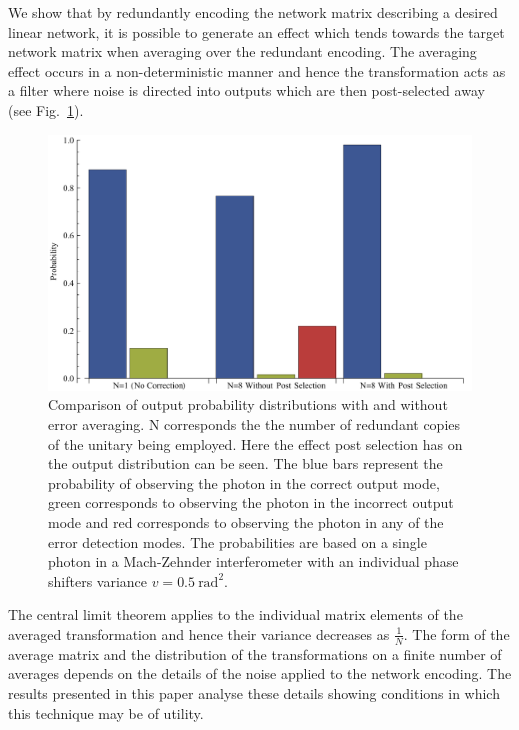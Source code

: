 \documentclass[aps,pra,twocolumn,superscriptaddress,numerical,floatfix]{revtex4-1}
\begin{document}
We show that by redundantly encoding the network matrix describing a desired linear network, it is possible to generate an effect which tends towards the target network matrix when averaging over the redundant encoding.   The averaging effect occurs in a non-deterministic manner and hence the transformation acts as a filter where noise is directed into outputs which are then post-selected away (see Fig.~\ref{fig:output_probabilities}).
\begin{figure}
	\begin{centering}
		\includegraphics[width=\columnwidth]{prob_distributions.pdf}
	\end{centering}
	\caption[Comparison of output probability distributions with and without Error Averaging.]{Comparison of output probability distributions with and without error averaging. N corresponds the the number of redundant copies of the unitary being employed. Here the effect post selection has on the output distribution can be seen. The blue bars represent the probability of observing the photon in the correct output mode, green corresponds to observing the photon in the incorrect output mode and red corresponds to observing the photon in any of the error detection modes. The probabilities are based on a single photon in a Mach-Zehnder interferometer with an individual phase shifters variance $v=0.5\ \textrm{rad}^{2}$.} 
	\label{fig:output_probabilities}
\end{figure}
The central limit theorem applies to the individual matrix elements of the averaged transformation and hence their variance decreases as $\frac{1}{N}$.  The form of the average matrix and the distribution of the transformations on a finite number of averages depends on the details of the noise applied to the network encoding.  The results presented in this paper analyse these details showing conditions in which this technique may be of utility. 
\end{document}
